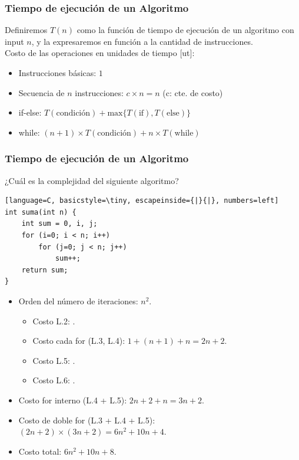 \documentclass{beamer}
\begin{document}
\begin{frame}[fragile]
 \frametitle{Tiempo de ejecución de un Algoritmo}
\small Definiremos $T(n)$ como la función de tiempo de ejecución de un algoritmo con input $n$, y la expresaremos en función a la cantidad de instrucciones.\\
\bigskip
Costo de las operaciones en unidades de tiempo [ut]:
\begin{itemize}
\item Instrucciones básicas: $1$
\item Secuencia de $n$ instrucciones:  $c \times n = n$ (c: cte. de costo)
\item if-else: $T(\text{condición}) + \text{max}\{T(\text{if}), T(\text{else})\}$
\item while: $(n+1) \times T(\text{condición}) + n \times T(\text{while}) $
\end{itemize}
\end{frame}


\begin{frame}[fragile]
 \frametitle{Tiempo de ejecución de un Algoritmo}
\begin{exampleblock}{¿Cuál es la complejidad del siguiente algoritmo?}
\begin{lstlisting}[language=C, basicstyle=\tiny, escapeinside={|}{|}, numbers=left]
int suma(int n) {
	int sum = 0, i, j;
	for (i=0; i < n; i++) 
		for (j=0; j < n; j++)
			sum++;
	return sum;
}
\end{lstlisting}
\end{exampleblock}
\pause
\begin{itemize}
\item Orden del número de iteraciones: $n^2$. \pause
\begin{itemize}
\item Costo L.2: . \pause 
\item Costo cada for (L.3, L.4): \pause $1+(n+1)+n = 2n+2$. \pause
\item Costo L.5: . \pause
\item Costo L.6: . \pause
\end{itemize}
\item Costo for interno (L.4 + L.5):  \pause $2n+2+n = 3n+2$. \pause
\item Costo de doble for (L.3 + L.4 + L.5): \pause $(2n+2) \times (3n+2) = 6n^2 + 10n + 4$. \pause
\item Costo total: \pause $6n^2 + 10n + 8$. \pause
\end{itemize}

\end{frame}
\end{document}
